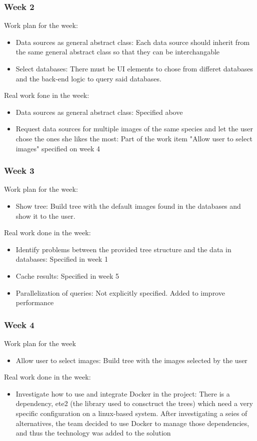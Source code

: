 \documentclass[10pt]{article}
\begin{document}
  \subsubsection{Week 2}
	Work plan for the week:
	\begin{itemize}
		\item Data sources as general abstract class: Each data source should inherit from the same general abstract class so that they can be interchangable
		\item Select databases: There must be UI elements to chose from differet databases and the back-end logic to query said databases.
	\end{itemize}
	Real work fone in the week:
	\begin{itemize}
		\item Data sources as general abstract class: Specified above
		\item Request data sources for multiple images of the same species and let the user chose the ones she likes the most: Part of the work item "Allow user to select images" specified on week 4
	\end{itemize}
  \subsubsection{Week 3}
  	Work plan for the week:
	\begin{itemize}
  		\item Show tree: Build tree with the default images found in the databases and show it to the user.
	\end{itemize}
	Real work done in the week:
	\begin{itemize}
		\item Identify problems  between the provided tree structure and the data in databases: Specified in week 1
		\item Cache results: Specified in week 5
		\item Parallelization of queries: Not explicitly specified. Added to improve performance
	\end{itemize}
  \subsubsection{Week 4}
  	Work plan for the week
  	\begin{itemize}
  		\item Allow user to select images: Build tree with the images selected by the user
	\end{itemize}
	Real work done in the week:
	\begin{itemize}
		\item Investigate how to use and integrate Docker in the project: There is a dependency, ete2 (the library used to consctruct the trees) which need a very specific configuration on a linux-based system. After investigating a seies of alternatives, the team decided to use Docker to manage those dependencies, and thus the technology was added to the solution
	\end{itemize}
\end{document}
